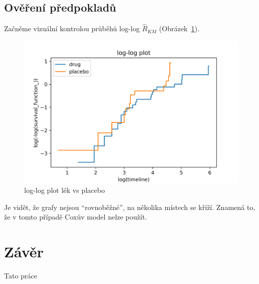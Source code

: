 \documentclass[a4, 11pt]{article}
\newcommand{\uvoz}[1]{``{#1}''}                        %
\theoremstyle{definition}
\theoremstyle{remark}
\begin{document}
	\subsection{Ověření předpokladů}
	Začněme vizuální kontrolou průběhů log-log $ \hat{R}_{KM} $ (Obrázek~\ref{fig:loglogplot_drug_vs_placebo}).
	 
	\begin{figure}[H]
		\centering
		\includegraphics[width=0.6\linewidth]{img/loglogplot_KM.png}
	 	\caption{log-log plot lék vs placebo}
	 	\label{fig:loglogplot_drug_vs_placebo}
	\end{figure}
	
	Je vidět, že grafy nejsou \uvoz{rovnoběžné}, na několika místech se kříží. 
    Znamená to, že v tomto případě Coxův model nelze použít. 

	
	\newpage
	\section{Závěr}\label{sec:zaver}
	Tato práce 
\end{document}
